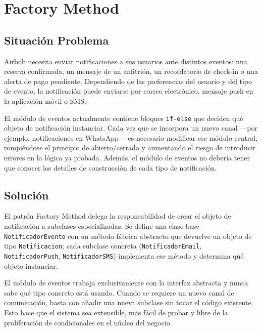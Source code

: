 
\chapter{Factory Method}

\section{Situación Problema}

Airbnb necesita enviar notificaciones a sus usuarios ante distintos
eventos: una reserva confirmada, un mensaje de un anfitrión, un recordatorio
de check-in o una alerta de pago pendiente. Dependiendo de las preferencias
del usuario y del tipo de evento, la notificación puede enviarse por correo
electrónico, mensaje push en la aplicación móvil o SMS.

El módulo de eventos actualmente contiene bloques \texttt{if-else} que
deciden qué objeto de notificación instanciar. Cada vez que se incorpora
un nuevo canal —por ejemplo, notificaciones en WhatsApp— es necesario
modificar ese módulo central, rompiéndose el principio de abierto/cerrado
y aumentando el riesgo de introducir errores en la lógica ya probada.
Además, el módulo de eventos no debería tener que conocer los detalles
de construcción de cada tipo de notificación.

\section{Solución}

El patrón Factory Method delega la responsabilidad de crear el objeto
de notificación a subclases especializadas. Se define una clase base
\texttt{NotificadorEvento} con un método fábrica abstracto que devuelve
un objeto de tipo \texttt{Notificacion}; cada subclase concreta
(\texttt{NotificadorEmail}, \texttt{NotificadorPush}, \texttt{NotificadorSMS})
implementa ese método y determina qué objeto instanciar.

El módulo de eventos trabaja exclusivamente con la interfaz abstracta y
nunca sabe qué tipo concreto está usando. Cuando se requiere un nuevo
canal de comunicación, basta con añadir una nueva subclase sin tocar el
código existente. Esto hace que el sistema sea extensible, más fácil de
probar y libre de la proliferación de condicionales en el núcleo del negocio.

